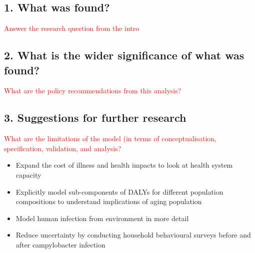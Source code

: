 \subsection{1.	What was found?}
\textcolor{red}{Answer the research question from the intro}
\subsection{2.	What is the wider significance of what was found?}
\textcolor{red}{What are the policy recommendations from this analysis?}
\subsection{3.	Suggestions for further research}
\textcolor{red}{What are the limitations of the model (in terms of conceptualisation, specification, validation, and analysis?}
\begin{itemize}
    \item Expand the cost of illness and health impacts to look at health system capacity
    \item Explicitly model sub-components of DALYs for different population compositions to understand implications of aging population
    \item Model human infection from environment in more detail
    \item Reduce uncertainty by conducting household behavioural surveys before and after campylobacter infection
\end{itemize}
